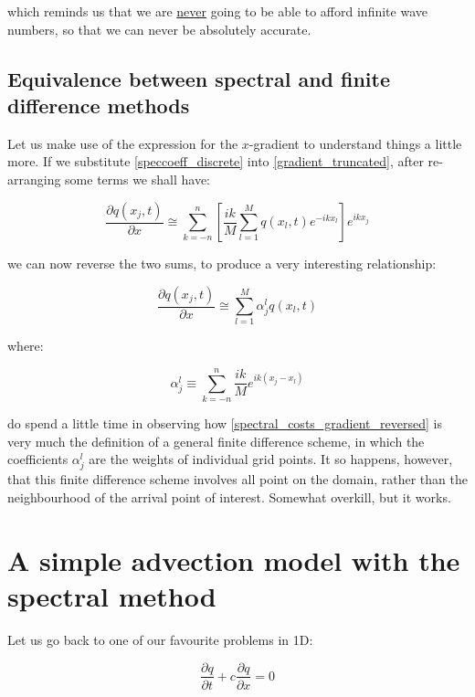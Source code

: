 which reminds us that we are \underline{never} going to be able to afford infinite wave numbers, so that we can never be absolutely accurate.

 \subsection{Equivalence between spectral and finite difference methods}
Let us make use of the expression for the $x$-gradient to understand things a little more. If we substitute \ref{speccoeff_discrete} into \ref{gradient_truncated}, after re-arranging some terms we shall have: 

\begin{equation}
	\frac{\partial	q(x_j,t)} {\partial x} \cong   \sum_{k=-n}^{n} \left[  \frac{ik}{M}  \sum_{l=1}^{M} q(x_l,t) e^{-ikx_l} \right] e^{ikx_j}
	\label{spectral_costs_gradient}
\end{equation}

we can now reverse the two sums, to produce a very interesting relationship:

\begin{equation}
	\frac{\partial	q(x_j,t)} {\partial x} \cong   \sum_{l=1}^{M}  \alpha_j^l  q(x_l,t)
	\label{spectral_costs_gradient_reversed}
\end{equation}

where:

\begin{equation} 
	\alpha_j^l \equiv \sum_{k=-n}^{n}  \frac{ik}{M}  e^{ik (x_j-x_l)} 
	\label{gradient_coefficients}
\end{equation}

do spend a little time in observing how \ref{spectral_costs_gradient_reversed} is very much the definition of a general finite difference scheme, in which the coefficients $\alpha_j^l$ are the weights of individual grid points. It so happens, however, that this finite difference scheme involves all point on the domain, rather than the neighbourhood of the arrival point of interest. Somewhat overkill, but it works.

\section{A simple advection model with the spectral method}
Let us go back to one of our favourite problems in 1D:

\begin{equation}
	\frac{\partial q}{\partial t} + c 	\frac{\partial q}{\partial x} = 0
\end{equation}

